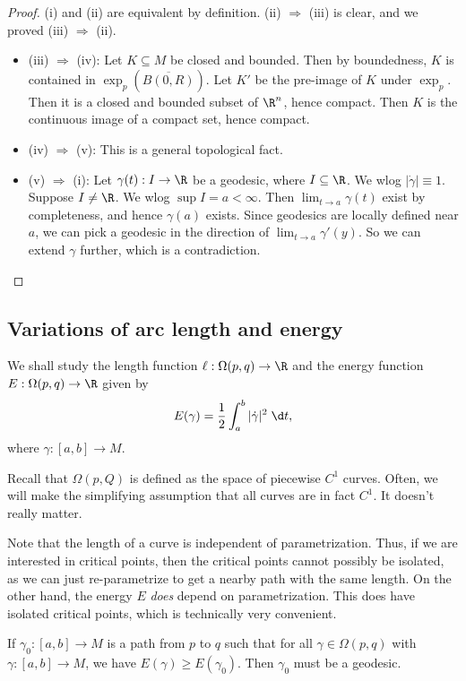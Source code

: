 \documentclass[a4paper]{article}
\begin{document}
\begin{proof}
  (i) and (ii) are equivalent by definition. (ii) $\Rightarrow$ (iii) is clear, and we proved (iii) $\Rightarrow$ (ii).

  \begin{itemize}
    \item (iii) $\Rightarrow$ (iv): Let $K \subseteq M$ be closed and bounded. Then by boundedness, $K$ is contained in $\exp_p(\overline{B(0, R)})$. Let $K'$ be the pre-image of $K$ under $\exp_p$. Then it is a closed and bounded subset of $\R^n$, hence compact. Then $K$ is the continuous image of a compact set, hence compact.
    \item (iv) $\Rightarrow$ (v): This is a general topological fact.
    \item (v) $\Rightarrow$ (i): Let $\gamma(t): I \to \R$ be a geodesic, where $I \subseteq \R$. We wlog $|\dot{\gamma}| \equiv 1$. Suppose $I \not= \R$. We wlog $\sup I = a < \infty$. Then $\lim_{t \to a} \gamma(t)$ exist by completeness, and hence $\gamma(a)$ exists. Since geodesics are locally defined near $a$, we can pick a geodesic in the direction of $\lim_{t \to a} \gamma'(y)$. So we can extend $\gamma$ further, which is a contradiction.
  \end{itemize}
\end{proof}

\subsection{Variations of arc length and energy}
We shall study the length function $\ell: \Omega(p, q) \to \R$ and the energy function $E: \Omega(p, q) \to \R$ given by
\[
  E(\gamma) = \frac{1}{2} \int_a^b|\dot{\gamma}|^2\;\d t,
\]
where $\gamma: [a, b] \to M$.

Recall that $\Omega(p, Q)$ is defined as the space of piecewise $C^1$ curves. Often, we will make the simplifying assumption that all curves are in fact $C^1$. It doesn't really matter.

Note that the length of a curve is independent of parametrization. Thus, if we are interested in critical points, then the critical points cannot possibly be isolated, as we can just re-parametrize to get a nearby path with the same length. On the other hand, the energy $E$ \emph{does} depend on parametrization. This does have isolated critical points, which is technically very convenient.

\begin{prop}
  If $\gamma_0: [a, b] \to M$ is a path from $p$ to $q$ such that for all $\gamma \in \Omega(p, q)$ with $\gamma:[a, b] \to M$, we have $E(\gamma) \geq E(\gamma_0)$. Then $\gamma_0$ must be a geodesic.
\end{prop}
\end{document}
